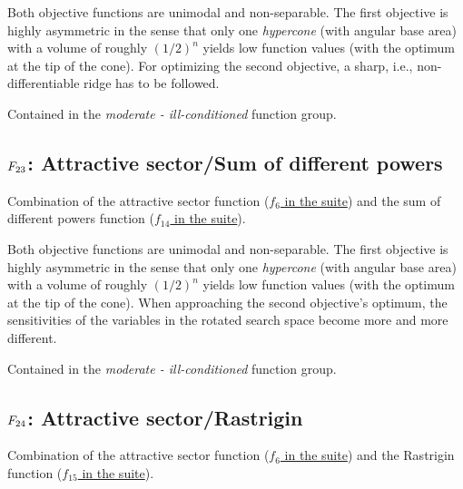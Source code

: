 Both objective functions are unimodal and non-separable. The
first objective is highly asymmetric in the sense that only one
\emph{hypercone} (with angular base area) with a volume of
roughly \((1/2)^n\) yields low function values (with the
optimum at the tip of the cone). For optimizing the second
objective, a sharp, i.e., non-differentiable ridge has to be followed.

Contained in the \emph{moderate - ill-conditioned} function group.



\subsection[\texorpdfstring{\protect\(F_{23}\protect\): Attractive sector/Sum of different powers}{F23: Attractive sector/Sum of different powers}]{\texorpdfstring{\protect\(F_{23}\protect\): Attractive sector/Sum of different powers}{}}
\label{index:f23}\label{index:attractive-sector-sum-of-different-powers}
Combination of the attractive sector function (\href{https://coco.gforge.inria.fr/downloads/download16.00/bbobdocfunctions.pdf\#page=30}{\(f_6\) in the \bbob suite}) and the sum of different powers function
(\href{https://coco.gforge.inria.fr/downloads/download16.00/bbobdocfunctions.pdf\#page=70}{\(f_{14}\) in the \bbob suite}).

Both objective functions are unimodal and non-separable. The
first objective is highly asymmetric in the sense that only one
\emph{hypercone} (with angular base area) with a volume of
roughly \((1/2)^n\) yields low function values (with the
optimum at the tip of the cone). When approaching the second
objective's optimum, the sensitivities of the variables in the
rotated search space become more and more different.

Contained in the \emph{moderate - ill-conditioned} function group.



\subsection[\texorpdfstring{\protect\(F_{24}\protect\): Attractive sector/Rastrigin}{F24: Attractive sector/Rastrigin}]{\texorpdfstring{\protect\(F_{24}\protect\): Attractive sector/Rastrigin}{}}
\label{index:attractive-sector-rastrigin}\label{index:f24}
Combination of the attractive sector function (\href{https://coco.gforge.inria.fr/downloads/download16.00/bbobdocfunctions.pdf\#page=30}{\(f_6\) in the \bbob suite}) and the Rastrigin function
(\href{https://coco.gforge.inria.fr/downloads/download16.00/bbobdocfunctions.pdf\#page=75}{\(f_{15}\) in the \bbob suite}).

